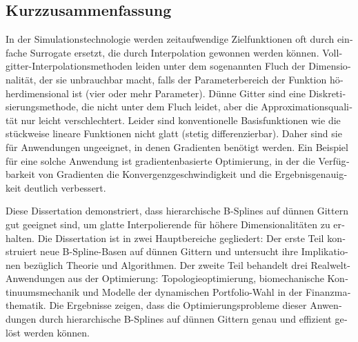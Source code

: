 \begin{otherlanguage}{ngerman}
  \section*{Kurzzusammenfassung}
  
  In der Simulationstechnologie werden zeitaufwendige Zielfunktionen
  oft durch einfache Surrogate ersetzt, die durch Interpolation
  gewonnen werden können.
  Vollgitter-Interpolationsmethoden leiden unter dem
  sogenannten Fluch der Dimensionalität,
  der sie unbrauchbar macht, falls der Parameterbereich der Funktion
  höherdimensional ist (vier oder mehr Parameter).
  Dünne Gitter sind eine Diskretisierungsmethode, die nicht unter
  dem Fluch leidet, aber die Approximationsqualität nur leicht verschlechtert.
  Leider sind konventionelle Basisfunktionen wie die stückweise
  lineare Funktionen nicht glatt (stetig differenzierbar).
  Daher sind sie für Anwendungen ungeeignet, in denen Gradienten
  benötigt werden.
  Ein Beispiel für eine solche Anwendung ist gradientenbasierte Optimierung,
  in der die Verfügbarkeit von Gradienten die Konvergenzgeschwindigkeit und
  die Ergebnisgenauigkeit deutlich verbessert.
  
  Diese Dissertation demonstriert, dass hierarchische B-Splines auf
  dünnen Gittern gut geeignet sind,
  um glatte Interpolierende für höhere Dimensionalitäten zu erhalten.
  Die Dissertation ist in zwei Hauptbereiche gegliedert:
  Der erste Teil konstruiert neue B-Spline-Basen auf dünnen Gittern und
  untersucht ihre Implikationen bezüglich Theorie und Algorithmen.
  Der zweite Teil behandelt drei Realwelt-Anwendungen aus der Optimierung:
  Topologieoptimierung, biomechanische Kontinuumsmechanik und
  Modelle der dynamischen Portfolio-Wahl in der Finanzmathematik.
  Die Ergebnisse zeigen, dass die Optimierungsprobleme dieser
  Anwendungen durch hierarchische B-Splines auf dünnen Gittern
  genau und effizient gelöst werden können.
\end{otherlanguage}

\printornamentstrue
\cleardoublepage
